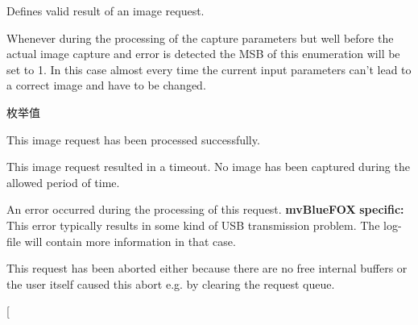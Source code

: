 Defines valid result of an image request. 

Whenever during the processing of the capture parameters but well before the actual image capture and error is detected the M\+S\+B of this enumeration will be set to 1. In this case almost every time the current input parameters can't lead to a correct image and have to be changed. \begin{Desc}
\item[枚举值]\par
\begin{description}
\item[{\em 
\hypertarget{group___common_interface_ggab6148762ea638f8eabbabfc9468b0d4cad28acd60e6412fff63df8a371061eae0}{rr\+O\+K}\label{group___common_interface_ggab6148762ea638f8eabbabfc9468b0d4cad28acd60e6412fff63df8a371061eae0}
}]This image request has been processed successfully. \item[{\em 
\hypertarget{group___common_interface_ggab6148762ea638f8eabbabfc9468b0d4ca4ffd725bafc2f99a661372b16a112e1d}{rr\+Timeout}\label{group___common_interface_ggab6148762ea638f8eabbabfc9468b0d4ca4ffd725bafc2f99a661372b16a112e1d}
}]This image request resulted in a timeout. No image has been captured during the allowed period of time. \item[{\em 
\hypertarget{group___common_interface_ggab6148762ea638f8eabbabfc9468b0d4ca2a00ef89aa79b2f83ff592cec89a8fad}{rr\+Error}\label{group___common_interface_ggab6148762ea638f8eabbabfc9468b0d4ca2a00ef89aa79b2f83ff592cec89a8fad}
}]An error occurred during the processing of this request. {\bfseries mv\+Blue\+F\+O\+X} {\bfseries specific\+:} This error typically results in some kind of U\+S\+B transmission problem. The log-\/file will contain more information in that case. \item[{\em 
\hypertarget{group___common_interface_ggab6148762ea638f8eabbabfc9468b0d4ca1cbca10402be52aff5b6d9bde9a601a9}{rr\+Request\+Aborted}\label{group___common_interface_ggab6148762ea638f8eabbabfc9468b0d4ca1cbca10402be52aff5b6d9bde9a601a9}
}]This request has been aborted either because there are no free internal buffers or the user itself caused this abort e.\+g. by clearing the request queue. \item[{\em 
}
\end{description}
\end{Desc}
